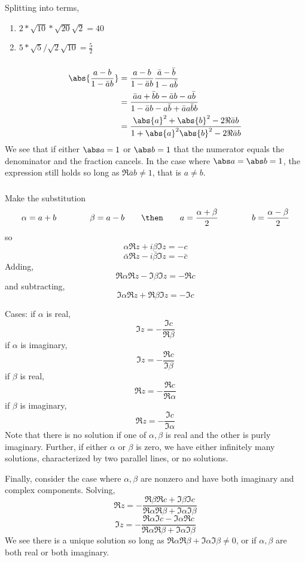 \subsubsection{}
Splitting into terms,
\begin{enumerate}[label = (\alph*)]
	\item \(2*\sqrt{10}*\sqrt{20}\sqrt{2}=40\)
	\item \(5*\sqrt{5}/\sqrt{2}\sqrt{10} = \frac{5}{2}\)
\end{enumerate}
\subsubsection{}
\begin{align*}
	\abs{\frac{a-b}{1-\bar a b}}&=\frac{a-b}{1-\bar a b}\frac{\bar a - \bar b}{1-a \bar b}\\
				    &=\frac{\bar a a + \bar b b -\bar a b - a\bar b}{1-\bar a b -a\bar b + \bar a a\bar b b}\\
				    &=\frac{\abs{a}^2+\abs{b}^2-2\Re{\bar a b}}{1+\abs{a}^2\abs{b}^2 - 2\Re{\bar a b}}
\end{align*}
We see that if either \(\abs a = 1\) or \(\abs b = 1\) that the numerator equals the denominator and the fraction cancels. In the case where \(\abs a = \abs b = 1\), the expression still holds so long as \(\Re \bar a b\neq 1\), that is \(a\neq b\).
\subsubsection{}
Make the substitution
\[\alpha = a+b\qquad\qquad \beta = a-b\qquad\then\qquad a = \frac{\alpha+\beta}{2}\qquad\qquad b = \frac{\alpha-\beta}{2}\]
so
\[\alpha\Re z + i\beta\Im z = -c\]
\[\bar \alpha \Re z - i \bar \beta \Im z = -\bar c\]
Adding,
\[\Re\alpha \Re z -\Im \beta \Im z = -\Re c\]
and subtracting,
\[\Im \alpha\Re z +\Re\beta\Im z = -\Im c\]

Cases:
if \(\alpha\) is real, 
\[\Im z = -\frac{\Im c}{\Re \beta}\]
if \(\alpha\) is imaginary,
\[\Im z = -\frac{\Re c}{\Im \beta}\]
if \(\beta\) is real, 
\[\Re z = -\frac{\Re c}{\Re \alpha}\]
if \(\beta\) is imaginary,
\[\Re z = -\frac{\Im c}{\Im\alpha}\]
Note that there is no solution if one of \(\alpha,\beta\) is real and the other is purly imaginary. Further, if either \(\alpha\) or \(\beta\) is zero, we have either infinitely many solutions, characterized by two parallel lines, or no solutions.

Finally, consider the case where \(\alpha,\beta\) are nonzero and have both imaginary and complex components. Solving,
\[\Re z = -\frac{\Re \beta\Re c+\Im\beta\Im c}{\Re\alpha\Re\beta +\Im\alpha\Im\beta}\]
\[\Im z = -\frac{\Re\alpha\Im c -\Im\alpha\Re c}{\Re\alpha\Re\beta + \Im\alpha\Im\beta}\]
We see there is a unique solution so long as \(\Re\alpha\Re\beta+\Im\alpha\Im\beta\neq 0\), or if \(\alpha,\beta\) are both real or both imaginary.

